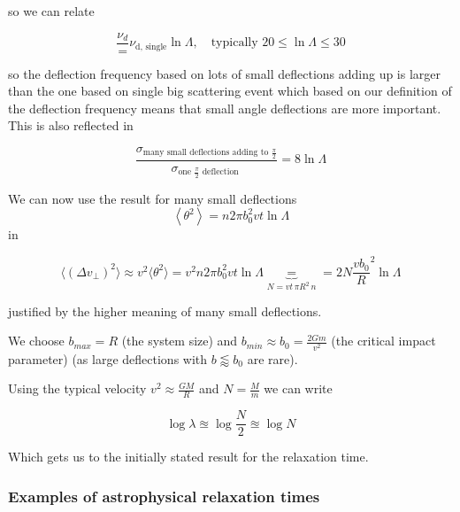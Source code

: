 so we can relate

\begin{equation}
    \frac{\nu_d} = \nu_{\text{d, single}} {\ln \Lambda}, \quad \text{typically } 20 \leq \ln \Lambda \leq 30
\end{equation}

so \textcolor{blue1}{the deflection frequency based on lots of small deflections adding up is
larger than the one based on single big scattering event} which based on our definition of the
deflection frequency means that small angle deflections are more important. This is also reflected
in

\begin{equation}
    \frac{\sigma_{\text {many small deflections adding to } \frac{\pi}{2}}}{\sigma_{\text {one } \frac{\pi}{2} \text { deflection }}}=8 \ln \Lambda
\end{equation}

We can now use the result for many small deflections
\begin{equation}
    \left\langle\theta^2\right\rangle=n 2 \pi b_0^2 v t \ln \Lambda
\end{equation}
in

\begin{equation}
    \langle (\Delta v_\perp)^2 \rangle \approx v^2 \langle \theta^2 \rangle = v^2 n 2 \pi b_0^2 v t \ln \Lambda \underbrace{=}_{N = vt \, \pi R^2 \, n} = 2N \frac{vb_0}{R}^2 \ln \Lambda
\end{equation}

justified by the higher meaning of many small deflections.

We choose $b_{max} = R$ (the system size) and $b_{min} \approx b_0 = \frac{2Gm}{v^2}$ (the critical impact parameter)
(as large deflections with $b \lessapprox b_0$ are rare).

Using the typical velocity $v^2 \approx \frac{GM}{R}$ and $N = \frac{M}{m}$ we can write

\begin{equation}
    \boxed{\log \lambda \approxeq \log \frac{N}{2} \approxeq \log N}
\end{equation}

Which gets us to the initially stated result for the relaxation time.

\subsubsection{Examples of astrophysical relaxation times}

